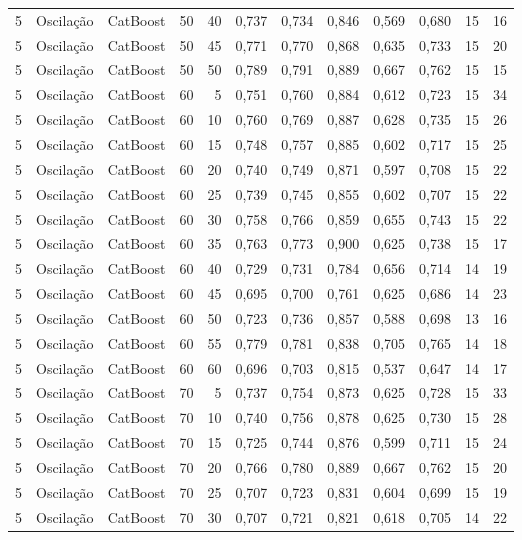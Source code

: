 \begin{longtable}{@{}rllrrrrrrrrr@{}}
5 & Oscilação & CatBoost & 50 & 40 & 0,737 & 0,734 & 0,846 & 0,569 & 0,680 & 15 & 16 \\
5 & Oscilação & CatBoost & 50 & 45 & 0,771 & 0,770 & 0,868 & 0,635 & 0,733 & 15 & 20 \\
5 & Oscilação & CatBoost & 50 & 50 & 0,789 & 0,791 & 0,889 & 0,667 & 0,762 & 15 & 15 \\
5 & Oscilação & CatBoost & 60 & 5 & 0,751 & 0,760 & 0,884 & 0,612 & 0,723 & 15 & 34 \\
5 & Oscilação & CatBoost & 60 & 10 & 0,760 & 0,769 & 0,887 & 0,628 & 0,735 & 15 & 26 \\
5 & Oscilação & CatBoost & 60 & 15 & 0,748 & 0,757 & 0,885 & 0,602 & 0,717 & 15 & 25 \\
5 & Oscilação & CatBoost & 60 & 20 & 0,740 & 0,749 & 0,871 & 0,597 & 0,708 & 15 & 22 \\
5 & Oscilação & CatBoost & 60 & 25 & 0,739 & 0,745 & 0,855 & 0,602 & 0,707 & 15 & 22 \\
5 & Oscilação & CatBoost & 60 & 30 & 0,758 & 0,766 & 0,859 & 0,655 & 0,743 & 15 & 22 \\
5 & Oscilação & CatBoost & 60 & 35 & 0,763 & 0,773 & 0,900 & 0,625 & 0,738 & 15 & 17 \\
5 & Oscilação & CatBoost & 60 & 40 & 0,729 & 0,731 & 0,784 & 0,656 & 0,714 & 14 & 19 \\
5 & Oscilação & CatBoost & 60 & 45 & 0,695 & 0,700 & 0,761 & 0,625 & 0,686 & 14 & 23 \\
5 & Oscilação & CatBoost & 60 & 50 & 0,723 & 0,736 & 0,857 & 0,588 & 0,698 & 13 & 16 \\
5 & Oscilação & CatBoost & 60 & 55 & 0,779 & 0,781 & 0,838 & 0,705 & 0,765 & 14 & 18 \\
5 & Oscilação & CatBoost & 60 & 60 & 0,696 & 0,703 & 0,815 & 0,537 & 0,647 & 14 & 17 \\
5 & Oscilação & CatBoost & 70 & 5 & 0,737 & 0,754 & 0,873 & 0,625 & 0,728 & 15 & 33 \\
5 & Oscilação & CatBoost & 70 & 10 & 0,740 & 0,756 & 0,878 & 0,625 & 0,730 & 15 & 28 \\
5 & Oscilação & CatBoost & 70 & 15 & 0,725 & 0,744 & 0,876 & 0,599 & 0,711 & 15 & 24 \\
5 & Oscilação & CatBoost & 70 & 20 & 0,766 & 0,780 & 0,889 & 0,667 & 0,762 & 15 & 20 \\
5 & Oscilação & CatBoost & 70 & 25 & 0,707 & 0,723 & 0,831 & 0,604 & 0,699 & 15 & 19 \\
5 & Oscilação & CatBoost & 70 & 30 & 0,707 & 0,721 & 0,821 & 0,618 & 0,705 & 14 & 22 \\

\end{longtable}
